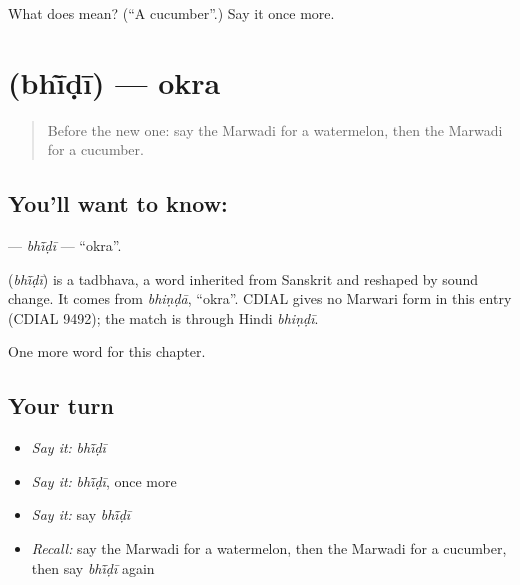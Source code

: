 \begin{tcolorbox}[breakable,colback=teal!4,colframe=teal!35!black,title={Before you move on}]
What does  mean? (\textquotedblleft{}A cucumber\textquotedblright{}.) Say it once more.
\end{tcolorbox}
\section[\texorpdfstring{\mw{भींडी} (bhī̃ḍī)}{भींडी (bhī̃ḍī)}]{ (bhī̃ḍī) — okra}

\label{lesson:MW-C135-bhidi}



\begin{quote}
Before the new one: say the Marwadi for a watermelon, then the Marwadi for a cucumber.
\end{quote}

\subsection*{You'll want to know: }
\textbf{} — \emph{bhī̃ḍī} — \textquotedblleft{}okra\textquotedblright{}.

\begin{cousinweb}
\textbf{} (\emph{bhī̃ḍī}) is a tadbhava, a word inherited from Sanskrit and reshaped by sound change. It comes from \emph{bhiṇḍā}, \textquotedblleft{}okra\textquotedblright{}. CDIAL gives no Marwari form in this entry (CDIAL 9492); the match is through Hindi \emph{bhiṇḍī}.
\end{cousinweb}

\begin{grammarlens}[title={What you've built}]
One more word for this chapter.
\end{grammarlens}

\subsection*{Your turn}
\begin{itemize}
\raggedright
  \item \emph{Say it:} \emph{bhī̃ḍī}
  \item \emph{Say it:} \emph{bhī̃ḍī}, once more
  \item \emph{Say it:} say \emph{bhī̃ḍī}
  \item \emph{Recall:} say the Marwadi for a watermelon, then the Marwadi for a cucumber, then say \emph{bhī̃ḍī} again
\end{itemize}

